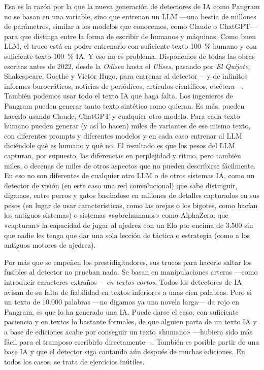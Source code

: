\documentclass[11pt,a4paper]{article}
\begin{document}
Esa es la razón por la que la nueva generación de detectores de IA como Pangram no se basan en una variable, sino que entrenan un LLM ---una bestia de millones de parámetros, similar a los modelos que conocemos, como Claude o ChatGPT--- para que distinga entre la forma de escribir de humanos y máquinas. Como buen LLM, el truco está en poder entrenarlo con suficiente texto 100~\% humano y con suficiente texto 100~\% IA. Y eso no es problema. Disponemos de todas las obras escritas antes de 2022, desde la \emph{Odisea} hasta el \emph{Ulises}, pasando por \emph{El Quijote}, Shakespeare, Goethe y Víctor Hugo, para entrenar al detector ---y de infinitos informes burocráticos, noticias de periódicos, artículos científicos, etcétera---. También podemos usar todo el texto IA que haga falta. Los ingenieros de Pangram pueden generar tanto texto sintético como quieran. Es más, pueden hacerlo usando Claude, ChatGPT y cualquier otro modelo. Para cada texto humano pueden generar (y así lo hacen) miles de variantes de ese mismo texto, con diferentes prompts y diferentes modelos y en cada caso entrenar al LLM diciéndole qué es humano y qué no. El resultado es que los pesos del LLM capturan, por supuesto, las diferencias en perplejidad y ritmo, pero también miles, o decenas de miles de otros aspectos que no pueden describirse fácilmente. En eso no son diferentes de cualquier otro LLM o de otros sistemas IA, como un detector de visión (en este caso una red convolucional) que sabe distinguir, digamos, entre perros y gatos basándose en millones de detalles capturados en sus pesos (en lugar de usar características, como las orejas o los bigotes, como hacían los antiguos sistemas) o sistemas «sobrehumanos» como AlphaZero, que «capturan» la capacidad de jugar al ajedrez con un Elo por encima de 3.500 sin que nadie les tenga que dar una sola lección de táctica o estrategia (como a los antiguos motores de ajedrez).

Por más que se empeñen los prestidigitadores, sus trucos para hacerle saltar los fusibles al detector no prueban nada. Se basan en manipulaciones arteras ---como introducir caracteres extraños--- \emph{en textos cortos}. Todos los detectores de IA avisan de su falta de fiabilidad en textos inferiores a unas cien palabras. Pero si un texto de 10.000 palabras ---no digamos ya una novela larga--- da rojo en Pangram, es que lo ha generado una IA. Puede darse el caso, con suficiente paciencia y en textos lo bastante formales, de que alguien parta de un texto IA y a base de ediciones acabe por conseguir un texto «humano» ---hubiera sido más fácil para el tramposo escribirlo directamente---. También es posible partir de una base IA y que el detector siga cantando aún después de muchas ediciones. En todos los casos, se trata de ejercicios inútiles.
\end{document}
